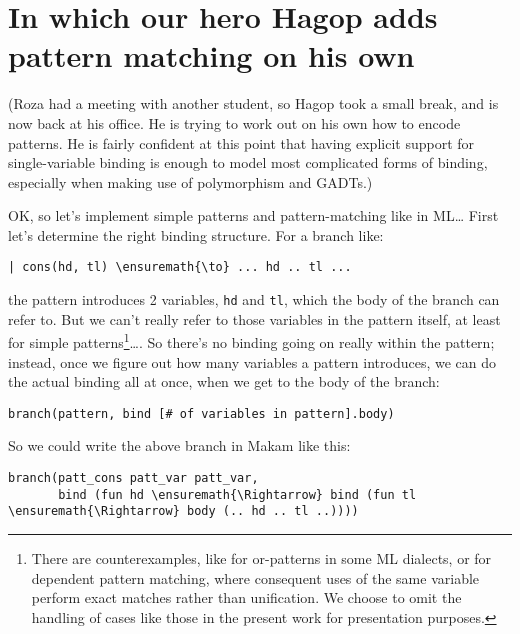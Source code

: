 \section{In which our hero Hagop adds pattern matching on his
own}\label{in-which-our-hero-hagop-adds-pattern-matching-on-his-own}

\begin{scenecomment}
(Roza had a meeting with another student, so Hagop took a small break, and is now back at his
office. He is trying to work out on his own how to encode patterns. He is fairly
confident at this point that having explicit support for single-variable
binding is enough to model most complicated forms of binding, especially when making use of
polymorphism and GADTs.)
\end{scenecomment}

\identNormal
\heroSTUDENT{} OK, so let's implement simple patterns and pattern-matching
like in ML\ldots{} First let's determine the right binding structure.
For a branch like:

\begin{verbatim}
| cons(hd, tl) \ensuremath{\to} ... hd .. tl ...
\end{verbatim}

the pattern introduces 2 variables, \texttt{hd} and \texttt{tl}, which
the body of the branch can refer to. But we can't really refer to those
variables in the pattern itself, at least for simple
patterns\footnote{There are counterexamples, like for or-patterns in some ML dialects, or for dependent pattern matching, where consequent uses of the same variable perform exact matches rather than unification. We choose to omit the handling of cases like those in the present work for presentation purposes.}\ldots{}.
So there's no binding going on really within the pattern; instead, once
we figure out how many variables a pattern introduces, we can do the
actual binding all at once, when we get to the body of the branch:

\begin{verbatim}
branch(pattern, bind [# of variables in pattern].body)
\end{verbatim}

So we could write the above branch in Makam like this:

\begin{verbatim}
branch(patt_cons patt_var patt_var,
       bind (fun hd \ensuremath{\Rightarrow} bind (fun tl \ensuremath{\Rightarrow} body (.. hd .. tl ..))))
\end{verbatim}

